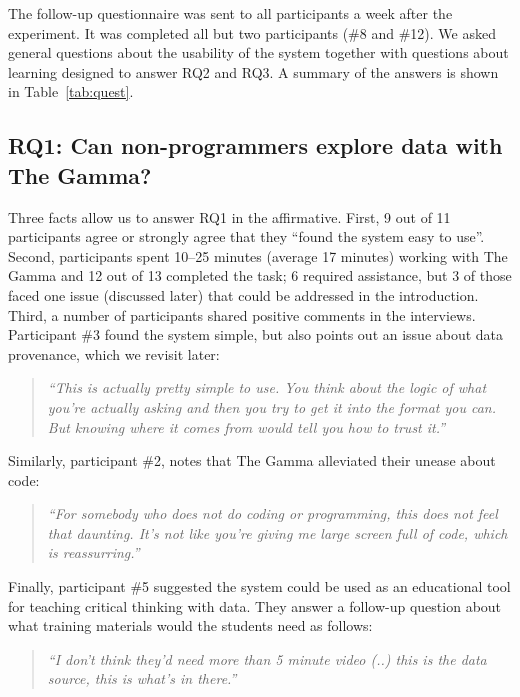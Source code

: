 \documentclass[manuscript,review,anonymous]{acmart}
\begin{document}
The follow-up questionnaire was sent to all participants a week after the experiment. It was
completed all but two participants (\#8 and \#12). We asked general questions about the usability
of the system together with questions about learning designed to answer RQ2 and RQ3. A summary
of the answers is shown in Table~\ref{tab:quest}.

\subsection*{RQ1: Can non-programmers explore data with The Gamma?}
Three facts allow us to answer RQ1 in the affirmative. First, 9 out of 11 participants agree or
strongly agree that they ``found the system easy to use''. Second, participants spent 10--25 minutes
(average 17 minutes) working with The Gamma and 12 out of 13 completed the task; 6 required assistance,
but 3 of those faced one issue (discussed later) that could be addressed in the introduction.
Third, a number of participants shared positive comments in the interviews.
Participant \#3 found the system simple, but also points out an issue about data provenance,
which we revisit later:

\begin{quote}
\emph{``This is actually pretty simple to use. You think about the logic of what you're actually
  asking and then you try to get it into the format you can. But knowing where it comes from
  would tell you how to trust it.''}
\end{quote}

\noindent
Similarly, participant \#2, notes that The Gamma alleviated their unease about code:

\begin{quote}
\emph{``For somebody who does not do coding or programming, this does not feel that daunting.
  It's not like you're giving me large screen full of code, which is reassurring.''}
\end{quote}

\noindent
Finally, participant \#5 suggested the system could be used as an educational tool for teaching
critical thinking with data. They answer a follow-up question about what training materials would
the students need as follows:

\begin{quote}
\emph{``I don't think they'd need more than 5 minute video (..) this is the data
  source, this is what's in there.''}
\end{quote}
\end{document}
